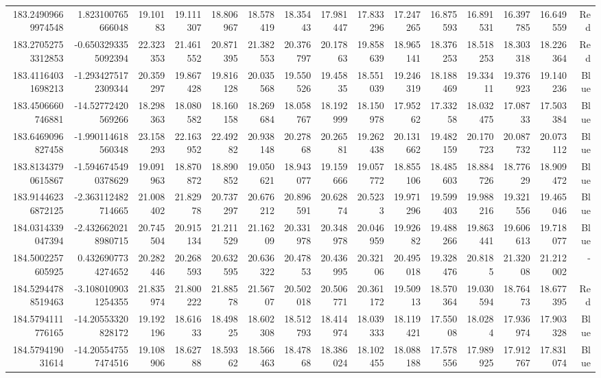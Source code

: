 \begin{center}
\begin{longtable}{rrrrrrrrrrrrrrr}
183.24909669974548 & 1.823100765666048 & 19.10183 & 19.111307 & 18.806967 & 18.578419 & 18.35443 & 17.981447 & 17.833296 & 17.247265 & 16.875593 & 16.891531 & 16.397785 & 16.649559 & Red \\
183.27052753312853 & -0.6503293355092394 & 22.323353 & 21.461552 & 20.871395 & 21.382553 & 20.376797 & 20.17863 & 19.858639 & 18.965141 & 18.376253 & 18.518253 & 18.303318 & 18.226364 & Red \\
183.41164031698213 & -1.2934275172309344 & 20.359297 & 19.867428 & 19.816128 & 20.035568 & 19.550526 & 19.45835 & 18.551039 & 19.246319 & 18.188469 & 19.33411 & 19.376923 & 19.140236 & Blue \\
183.4506660746881 & -14.52772420569266 & 18.298363 & 18.080582 & 18.160158 & 18.269684 & 18.058767 & 18.192999 & 18.150978 & 17.95262 & 17.33258 & 18.032475 & 17.08733 & 17.503384 & Blue \\
183.6469096827458 & -1.990114618560348 & 23.158293 & 22.163952 & 22.49282 & 20.938148 & 20.27868 & 20.26581 & 19.262438 & 20.131662 & 19.482159 & 20.170723 & 20.087732 & 20.073112 & Blue \\
183.81343790615867 & -1.5946745490378629 & 19.091963 & 18.870872 & 18.890852 & 19.050621 & 18.943077 & 19.159666 & 19.057772 & 18.855106 & 18.485603 & 18.884726 & 18.77629 & 18.909472 & Blue \\
183.91446236872125 & -2.363112482714665 & 21.008402 & 21.82978 & 20.737297 & 20.676212 & 20.896591 & 20.62874 & 20.5233 & 19.971296 & 19.599403 & 19.988216 & 19.321556 & 19.465046 & Blue \\
184.0314339047394 & -2.4326620218980715 & 20.745504 & 20.915134 & 21.211529 & 21.16209 & 20.331978 & 20.348978 & 20.046959 & 19.92682 & 19.488266 & 19.863441 & 19.606613 & 19.718077 & Blue \\
184.5002257605925 & 0.4326907734274652 & 20.282446 & 20.268593 & 20.632595 & 20.636322 & 20.47853 & 20.436995 & 20.32106 & 20.495018 & 19.328476 & 20.8185 & 21.32008 & 21.212002 & - \\
184.52944788519463 & -3.1080109031254355 & 21.835974 & 21.800222 & 21.88578 & 21.56707 & 20.502018 & 20.506771 & 20.361172 & 19.50913 & 18.570364 & 19.030594 & 18.76473 & 18.677395 & Red \\
184.5794111776165 & -14.20553320828172 & 19.192196 & 18.61633 & 18.49825 & 18.602308 & 18.512793 & 18.414974 & 18.039333 & 18.119421 & 17.55008 & 18.0284 & 17.936974 & 17.903328 & Blue \\
184.579419031614 & -14.205547557474516 & 19.108906 & 18.62788 & 18.59362 & 18.566463 & 18.47868 & 18.386024 & 18.102455 & 18.088188 & 17.578556 & 17.989925 & 17.912767 & 17.831074 & Blue \\

\end{longtable}
\end{center}
